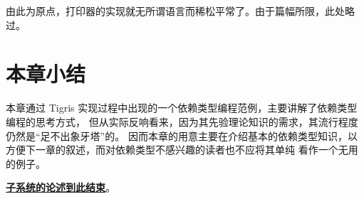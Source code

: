 由此为原点，打印器的实现就无所谓语言而稀松平常了。由于篇幅所限，此处略过。

\section{本章小结}
本章通过 Tigris 实现过程中出现的一个依赖类型编程范例，主要讲解了依赖类型编程的思考方式，
但从实际反响看来，因为其先验理论知识的需求，其流行程度仍然是“足不出象牙塔”的。
因而本章的用意主要在介绍基本的依赖类型知识，以方便下一章的叙述，而对依赖类型不感兴趣的读者也不应将其单纯
看作一个无用的例子。

\vspace{1cm}

\begin{center}
\underline{\bf\Tigris 子系统的论述到此结束}。
\end{center}
